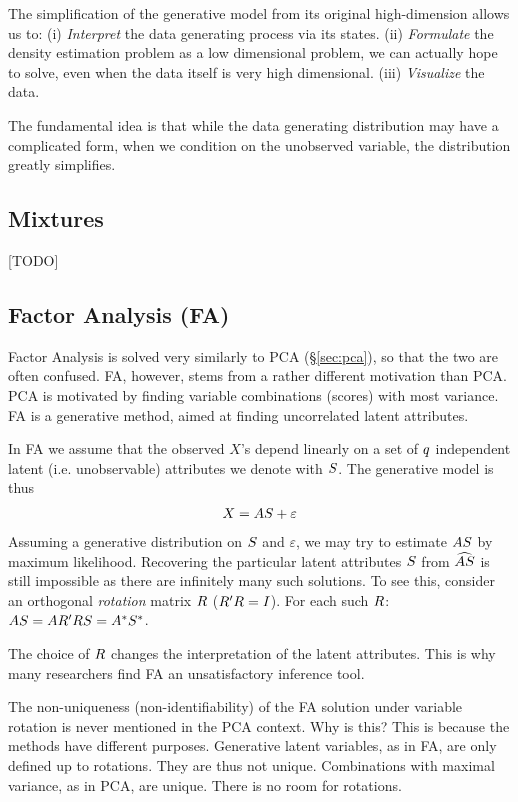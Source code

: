 The simplification of the generative model from its original high-dimension allows us to:
(i) \emph{Interpret} the data generating process via its states. 
(ii) \emph{Formulate} the density estimation problem as a low dimensional problem, we can actually hope to solve, even when the data itself is very high dimensional.
(iii) \emph{Visualize} the data. 

The fundamental idea is that while the data generating distribution may have a complicated form, when we condition on the unobserved variable, the distribution greatly simplifies. 


\subsection{Mixtures}
[TODO]



\subsection{Factor Analysis (FA)}
\label{sec:factor_analysis}

Factor Analysis is solved very similarly to PCA (\S\ref{sec:pca}), so that the two are often confused. 
FA, however, stems from a rather different motivation than PCA.
PCA is motivated by finding variable combinations (scores) with most variance. 
FA is a generative method, aimed at finding uncorrelated latent attributes. 

In FA we assume that the observed $X$'s depend linearly on a set of $q$ independent latent (i.e. unobservable) attributes we denote with $S$.
The generative model is thus
\begin{align}
\label{eq:factor}
	X=A S+\varepsilon
\end{align}
Assuming a generative distribution on $S$ and $\varepsilon$, we may try to estimate $A S$ by maximum likelihood.
Recovering the particular latent attributes $S$ from $\widehat{AS}$ is still impossible as there are infinitely many such solutions. To see this, consider an orthogonal \emph{rotation} matrix $R$ ($R' R=I$). For each such $R$: $ A S=A R' R S = A^* S^*$.

The choice of $R$ changes the interpretation of the latent attributes. This is why many researchers find FA an unsatisfactory inference tool.

\begin{remark}
	The non-uniqueness (non-identifiability) of the FA solution under variable rotation is never mentioned in the PCA context. Why is this?
	This is because the methods have different purposes. 
	Generative latent variables, as in FA, are only defined up to rotations. They are thus not unique. 
	Combinations with maximal variance, as in PCA, are unique. There is no room for rotations.
\end{remark}



